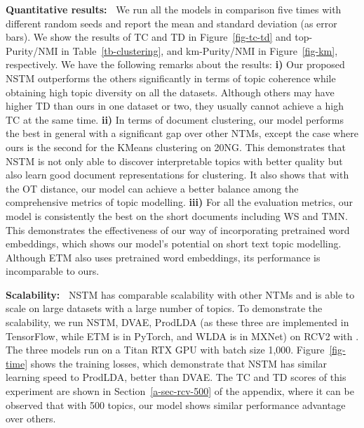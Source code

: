 \documentclass{article}
\begin{document}
\textbf{Quantitative results:~} We run all the models in comparison five times with different random seeds and report the mean and standard deviation (as error bars).
We show the results of TC and TD in Figure~\ref{fig-tc-td} and top-Purity/NMI in Table~\ref{tb-clustering}, and km-Purity/NMI in Figure~\ref{fig-km}, respectively.
We have the following remarks about the results:
\textbf{i)} Our proposed NSTM outperforms the others significantly in terms of topic coherence while obtaining high topic diversity on all the datasets. Although others may have higher TD than ours in one dataset or two, they usually cannot achieve a high TC at the same time.
\textbf{ii)} In terms of document clustering, our model performs the best in general with a significant gap over other NTMs, except the case where ours is the second for the KMeans clustering on 20NG. This demonstrates that NSTM is not only able to discover interpretable topics with better quality but also learn good document representations for clustering. It also shows that with the OT distance, our model can achieve a better balance among the comprehensive metrics of topic modelling.
\textbf{iii)} For all the evaluation metrics, our model is consistently the best on the short documents including WS and TMN. This demonstrates the effectiveness of our way of incorporating pretrained word embeddings, which shows our model's potential on short text topic modelling. Although ETM also uses pretrained word embeddings, its performance is incomparable to ours.





\textbf{Scalability:~}
NSTM has comparable scalability with other NTMs and is able to scale on large datasets with a large number of topics. To demonstrate the scalability, we run NSTM, DVAE, ProdLDA (as these three are implemented in TensorFlow, while ETM is in PyTorch, and WLDA is in MXNet) on RCV2 with . The three models run on a Titan RTX GPU with batch size 1,000. Figure~\ref{fig-time} shows the training losses, which demonstrate that NSTM has similar learning speed to ProdLDA, better than DVAE. The TC and TD scores of this experiment are shown in Section~\ref{a-sec-rcv-500} of the appendix, where it can be observed that with 500 topics, our model shows similar performance advantage over others.
\end{document}

